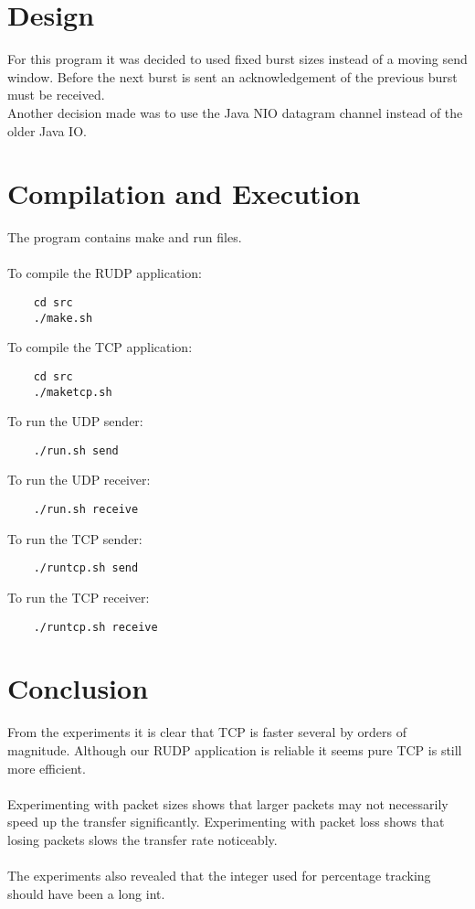 \documentclass[a4paper,10pt]{article}
\begin{document}
\section{Design}
For this program it was decided to used fixed burst sizes instead of a moving
send window. Before the next burst is sent an acknowledgement of the previous
burst must be received.\\
Another decision made was to use the Java NIO datagram channel instead of
the older Java IO.

\section{Compilation and Execution}
The program contains make and run files.\\\\
To compile the RUDP application:
\begin{verbatim}
	cd src
	./make.sh
\end{verbatim}
To compile the TCP application:
\begin{verbatim}
	cd src
	./maketcp.sh
\end{verbatim}
To run the UDP sender:
\begin{verbatim}
	./run.sh send
\end{verbatim}
To run the UDP receiver:
\begin{verbatim}
	./run.sh receive
\end{verbatim}
To run the TCP sender:
\begin{verbatim}
	./runtcp.sh send
\end{verbatim}
To run the TCP receiver:
\begin{verbatim}
	./runtcp.sh receive
\end{verbatim}

\section{Conclusion}
From the experiments it is clear that TCP is faster several by orders of magnitude.
Although our RUDP application is reliable it seems pure TCP is still more
efficient.\\\\
Experimenting with packet sizes shows that larger packets may not necessarily
speed up the transfer significantly.
Experimenting with packet loss shows that losing packets slows the transfer
rate noticeably.\\\\
The experiments also revealed that the integer used for percentage tracking
should have been a long int.

\pagebreak


\end{document}
